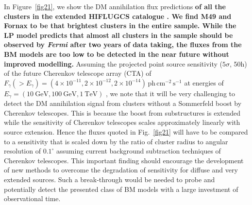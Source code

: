 \documentclass[10pt,aps,pra,reprint,amsmath,amsfonts,amssymb,showpacs,nofootinbib,floatfix]{revtex4-1}
\def\del#1{{}}
\def\C#1{{\bf #1}}
\newcommand{\Fermi}{{\em Fermi}\xspace}
\newcommand{\rmn}{\mathrm}
\begin{document}
In Figure~\ref{fig21}, we show the DM annihilation flux predictions
\del{of the entire sample} \C{of all the clusters in the extended
  HIFLUGCS catalogue \cite{2007A&A...466..805C}. We find M49 and
  Fornax to be that brightest clusters in the entire sample. While the
  LP model predicts that almost all clusters in the sample should be
  observed by \Fermi after two years of data taking, the fluxes from
  the BM models are too low to be detected in the near future without
  improved modelling.} Assuming the projected point source
sensitivity ($5\sigma$, 50h) of the future Cherenkov telescope array
(CTA) of $F_\gamma(>E_\gamma) = (4\times10^{-11}, 2\times10^{-12},
2\times10^{-14})\,\rmn{ph}\,\rmn{cm}^{-2}\,\rmn{s}^{-1}$ at energies
of $E_\gamma=(10~\rmn{GeV}, 100~\rmn{GeV}, 1~\rmn{TeV})$
\cite{Doro:2009qs}, we note that it will be very challenging to detect
the DM annihilation signal from clusters without a Sommerfeld boost by
Cherenkov telescopes. This is because the boost from substructures is
extended while the sensitivity of Cherenkov telescopes scales
approximately linearly with source extension. Hence the fluxes quoted
in Fig.~\ref{fig21} will have to be compared to a sensitivity that is
scaled down by the ratio of cluster radius to angular resolution of
$0.1^\circ$ assuming current background subtraction techniques of
Cherenkov telescopes. This important finding should encourage the
development of new methods to overcome the degradation of sensitivity
for diffuse and very extended sources. Such a break-through would be
needed to probe and potentially detect the presented class of BM
models with a large investment of observational time.
\end{document}
